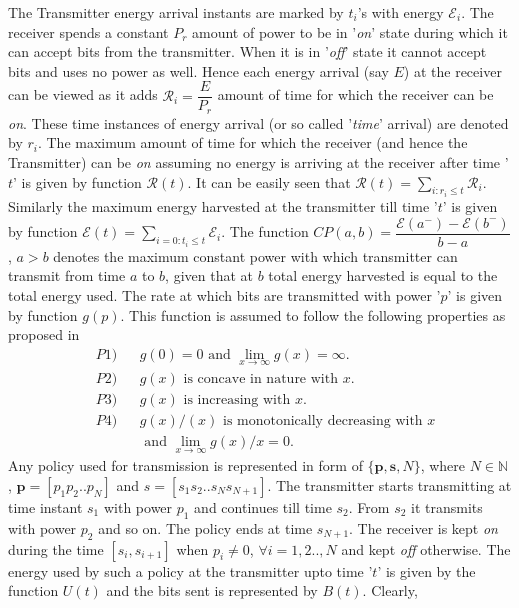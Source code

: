 The Transmitter energy arrival instants are marked by $t_i$'s with energy $\mathcal{E}_i$. %
 The receiver spends a constant $P_{r}$ amount of power to be in '\textit{on}' state during which it can accept bits from the transmitter. When it is in '\textit{off}' state it cannot accept bits and uses no power as well. Hence each energy arrival (say $E$) at the receiver can be viewed as it adds $\mathcal{R}_i=\dfrac{E}{P_{r}}$ amount of time for which the receiver can be \textit{on}. These time instances of energy arrival (or so called '\textit{time}' arrival) are denoted by $r_i$. The maximum amount of time for which the receiver (and hence the Transmitter) can be \textit{on} assuming no energy is arriving at the receiver after time '$t$' is given by function $\mathcal{R}(t)$. It can be easily seen that $\mathcal{R}(t)=\underset{i:r_i\le t}{\sum}\mathcal{R}_i$. Similarly the maximum energy harvested at the transmitter till time '$t$' is given by function $\mathcal{E}(t)=\underset{i=0:t_i\le t}{\sum}\mathcal{E}_i$. The function $CP(a,b)=\dfrac{\mathcal{E}(a^- )-\mathcal{E}(b^- )}{b-a}$ , $a>b$ denotes the maximum constant power with which transmitter can transmit from time $a$ to $b$, given that at $b$ total energy harvested is equal to the total energy used. The rate at which bits are transmitted with power '$p$' is given by function $g(p)$. This function is assumed to follow the following properties as proposed in \cite{Yang} 
\begin{align}
&P1) &&g(0)=0\text{ and }\lim_{x\rightarrow \infty} g(x)= \infty.\label{property_0_infty}
\\
&P2) &&g(x)\text{ is concave in nature with } x.\label{property_concave}
\\
&P3) &&g(x)\text{ is increasing with } x.\label{property_increasing}
\\ 
&P4) &&g(x)/(x) \text{ is monotonically decreasing with } x\nonumber
\\
&    &&\text{ and } \lim_{x\rightarrow \infty} g(x)/x= 0.\label{property_decreasing}
\end{align}
Any policy used for transmission is represented in form of $\{\textbf{p},\textbf{s},N\}$, where $N\in \mathbb{N}$, $\textbf{p}=[p_1 p_2 .. p_N]$ and $s=[s_1 s_2 .. s_N s_{N+1}]$. The transmitter starts transmitting at time instant $s_1$ with power $p_1$ and continues till time $s_2$. From $s_2$ it transmits with power $p_2$ and so on. The policy ends at time $s_{N+1}$. The receiver is kept \textit{on} during the time $[s_i,s_{i+1}]$ when $p_i\ne 0$, $\forall i=1,2..,N$ and kept \textit{off} otherwise. The energy used by such a policy at the transmitter upto time '$t$' is given by the function $U(t)$ and the bits sent is represented by $B(t)$. Clearly,

